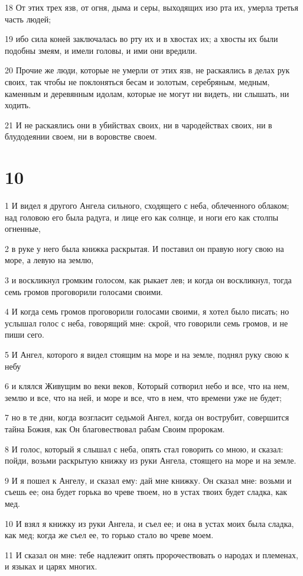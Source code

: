 \par 18 От этих трех язв, от огня, дыма и серы, выходящих изо рта их, умерла третья часть людей;
\par 19 ибо сила коней заключалась во рту их и в хвостах их; а хвосты их были подобны змеям, и имели головы, и ими они вредили.
\par 20 Прочие же люди, которые не умерли от этих язв, не раскаялись в делах рук своих, так чтобы не поклоняться бесам и золотым, серебряным, медным, каменным и деревянным идолам, которые не могут ни видеть, ни слышать, ни ходить.
\par 21 И не раскаялись они в убийствах своих, ни в чародействах своих, ни в блудодеянии своем, ни в воровстве своем.

\chapter{10}

\par 1 И видел я другого Ангела сильного, сходящего с неба, облеченного облаком; над головою его была радуга, и лице его как солнце, и ноги его как столпы огненные,
\par 2 в руке у него была книжка раскрытая. И поставил он правую ногу свою на море, а левую на землю,
\par 3 и воскликнул громким голосом, как рыкает лев; и когда он воскликнул, тогда семь громов проговорили голосами своими.
\par 4 И когда семь громов проговорили голосами своими, я хотел было писать; но услышал голос с неба, говорящий мне: скрой, что говорили семь громов, и не пиши сего.
\par 5 И Ангел, которого я видел стоящим на море и на земле, поднял руку свою к небу
\par 6 и клялся Живущим во веки веков, Который сотворил небо и все, что на нем, землю и все, что на ней, и море и все, что в нем, что времени уже не будет;
\par 7 но в те дни, когда возгласит седьмой Ангел, когда он вострубит, совершится тайна Божия, как Он благовествовал рабам Своим пророкам.
\par 8 И голос, который я слышал с неба, опять стал говорить со мною, и сказал: пойди, возьми раскрытую книжку из руки Ангела, стоящего на море и на земле.
\par 9 И я пошел к Ангелу, и сказал ему: дай мне книжку. Он сказал мне: возьми и съешь ее; она будет горька во чреве твоем, но в устах твоих будет сладка, как мед.
\par 10 И взял я книжку из руки Ангела, и съел ее; и она в устах моих была сладка, как мед; когда же съел ее, то горько стало во чреве моем.
\par 11 И сказал он мне: тебе надлежит опять пророчествовать о народах и племенах, и языках и царях многих.


